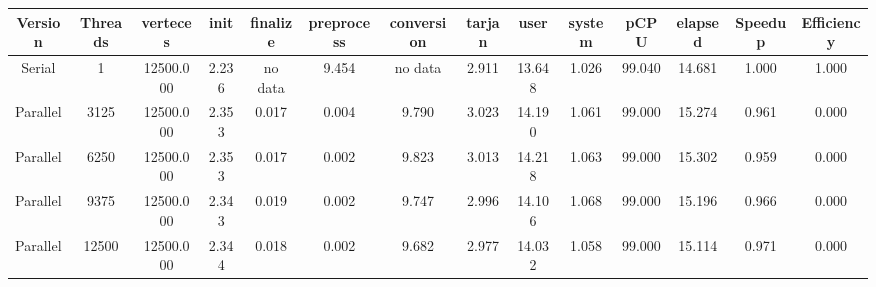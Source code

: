 \begin{tabular}{|c|c|c|c|c|c|c|c|c|c|c|c|c|c|}
\toprule
 Version &  Threads &  verteces &  init & finalize &  preprocess & conversion &  tarjan &   user &  system &   pCPU &  elapsed &  Speedup &  Efficiency \\
\midrule
  Serial &        1 & 12500.000 & 2.236 &  no data &       9.454 &    no data &   2.911 & 13.648 &   1.026 & 99.040 &   14.681 &    1.000 &       1.000 \\
Parallel &     3125 & 12500.000 & 2.353 &    0.017 &       0.004 &      9.790 &   3.023 & 14.190 &   1.061 & 99.000 &   15.274 &    0.961 &       0.000 \\
Parallel &     6250 & 12500.000 & 2.353 &    0.017 &       0.002 &      9.823 &   3.013 & 14.218 &   1.063 & 99.000 &   15.302 &    0.959 &       0.000 \\
Parallel &     9375 & 12500.000 & 2.343 &    0.019 &       0.002 &      9.747 &   2.996 & 14.106 &   1.068 & 99.000 &   15.196 &    0.966 &       0.000 \\
Parallel &    12500 & 12500.000 & 2.344 &    0.018 &       0.002 &      9.682 &   2.977 & 14.032 &   1.058 & 99.000 &   15.114 &    0.971 &       0.000 \\
\bottomrule
\end{tabular}
